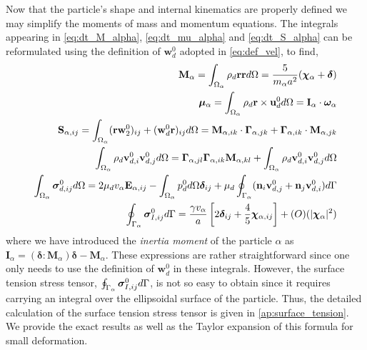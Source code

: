 Now that the particle's shape and internal kinematics are properly defined we may simplify the moments of mass and momentum equations. 
The integrals appearing in \ref{eq:dt_M_alpha}, \ref{eq:dt_mu_alpha} and \ref{eq:dt_S_alpha} can be reformulated using the definition of $\textbf{w}_d^0$ adopted in \ref{eq:def_vel}, to find, 
\begin{align}
    \textbf{M}_\alpha 
    = \intO{ \rho_d \textbf{rr} }
    = \frac{5}{m_\alpha a^2} (\bm\chi_\alpha+\bm\delta)\\
    \bm\mu_\alpha 
    = \intO{ \rho_d \textbf{r}\times\textbf{u}_d^0 }
    = \textbf{I}_\alpha \cdot \bm\omega_\alpha\\
    \textbf{S}_{\alpha,ij} = \intO{(\textbf{rw}_ 2^0 )_{ij}+ (\textbf{w}_d^0 \textbf{r})_{ij}} 
    = \textbf{M}_{\alpha,ik} \cdot \bm\Gamma_{\alpha,jk}
        +  \bm\Gamma_{\alpha,ik} \cdot \textbf{M}_{\alpha,jk}
    \\
    \intO{\rho_d \textbf{v}_{d,i}^0\textbf{v}_{d,j}^0}
    = \bm\Gamma_{\alpha,jl}\bm\Gamma_{\alpha,ik} \textbf{M}_{\alpha,kl}  
    +\intO{\rho_d \textbf{v}_{d,i}^0\textbf{v}_{d,j}^0}
    \label{eq:ww_def}
    \\
    \label{eq:sigma_d_def}
    \intO{\bm\sigma_{d,ij}^0}
    =
    2 \mu_d v_\alpha \textbf{E}_{\alpha,ij}
    - \intO{p_d^0} \bm\delta_{ij}
    + \mu_d \intS{(\textbf{n}_i \textbf{v}_{d,j}^0 + \textbf{n}_j \textbf{v}_{d,i}^0)}
    \\
    \intS{\bm\sigma_{I,ij}^0}
    = \frac{\gamma v_\alpha }{a} \left[
        2\bm\delta_{ij} 
        + \frac{4  }{5} \bm\chi_{\alpha,ij}
    \right]
    +\mathcal(O)(|\bm\chi_\alpha|^2)
\end{align}
where we have introduced the \textit{inertia moment} of the particle $\alpha$ as $\textbf{I}_\alpha = (\bm\delta : \textbf{M}_\alpha)\bm\delta - \textbf{M}_\alpha$. 
These expressions are rather straightforward since one only needs to use the definition of $\textbf{w}_d^0$ in these integrals. 
However, the surface tension stress tensor, $\oint_{\Gamma_{\alpha}} \bm\sigma_{I,ij}^0 d\Gamma$, is not so easy to obtain since it requires carrying an integral over the ellipsoidal surface of the particle.
Thus, the detailed calculation of the surface tension stress tensor is given in \ref{ap:surface_tension}. 
We provide the exact results as well as the Taylor expansion of this formula for small deformation. 
